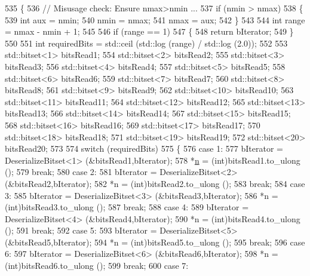 \begin{DoxyCode}
535 \{
536   \textcolor{comment}{// Misusage check: Ensure nmax>nmin ...}
537   \textcolor{keywordflow}{if} (nmin > nmax)
538     \{
539       \textcolor{keywordtype}{int} aux = nmin;
540       nmin = nmax;
541       nmax = aux;
542     \}
543 
544   \textcolor{keywordtype}{int} range = nmax - nmin + 1;
545 
546   \textcolor{keywordflow}{if} (range == 1)
547     \{
548       \textcolor{keywordflow}{return} bIterator;
549     \}
550 
551   \textcolor{keywordtype}{int} requiredBits = std::ceil (std::log (range) / std::log (2.0));
552 
553   std::bitset<1> bitsRead1;
554   std::bitset<2> bitsRead2;
555   std::bitset<3> bitsRead3;
556   std::bitset<4> bitsRead4;
557   std::bitset<5> bitsRead5;
558   std::bitset<6> bitsRead6;
559   std::bitset<7> bitsRead7;
560   std::bitset<8> bitsRead8;
561   std::bitset<9> bitsRead9;
562   std::bitset<10> bitsRead10;
563   std::bitset<11> bitsRead11;
564   std::bitset<12> bitsRead12;
565   std::bitset<13> bitsRead13;
566   std::bitset<14> bitsRead14;
567   std::bitset<15> bitsRead15;
568   std::bitset<16> bitsRead16;
569   std::bitset<17> bitsRead17;
570   std::bitset<18> bitsRead18;
571   std::bitset<19> bitsRead19;
572   std::bitset<20> bitsRead20;
573 
574   \textcolor{keywordflow}{switch} (requiredBits)
575     \{
576     \textcolor{keywordflow}{case} 1:
577       bIterator = DeserializeBitset<1> (&bitsRead1,bIterator);
578       *\hyperlink{namespacesample-rng-plot_aeb5ee5c431e338ef39b7ac5431242e1d}{n} = (int)bitsRead1.to\_ulong ();
579       \textcolor{keywordflow}{break};
580     \textcolor{keywordflow}{case} 2: 
581       bIterator = DeserializeBitset<2> (&bitsRead2,bIterator);
582       *n = (int)bitsRead2.to\_ulong ();
583       \textcolor{keywordflow}{break};
584     \textcolor{keywordflow}{case} 3: 
585       bIterator = DeserializeBitset<3> (&bitsRead3,bIterator);
586       *n = (int)bitsRead3.to\_ulong ();
587       \textcolor{keywordflow}{break};
588     \textcolor{keywordflow}{case} 4: 
589       bIterator = DeserializeBitset<4> (&bitsRead4,bIterator);
590       *n = (int)bitsRead4.to\_ulong ();
591       \textcolor{keywordflow}{break};
592     \textcolor{keywordflow}{case} 5:
593       bIterator = DeserializeBitset<5> (&bitsRead5,bIterator);
594       *n = (int)bitsRead5.to\_ulong ();
595       \textcolor{keywordflow}{break};
596     \textcolor{keywordflow}{case} 6:
597       bIterator = DeserializeBitset<6> (&bitsRead6,bIterator);
598       *n = (int)bitsRead6.to\_ulong ();
599       \textcolor{keywordflow}{break};
600     \textcolor{keywordflow}{case} 7:

\end{DoxyCode}
